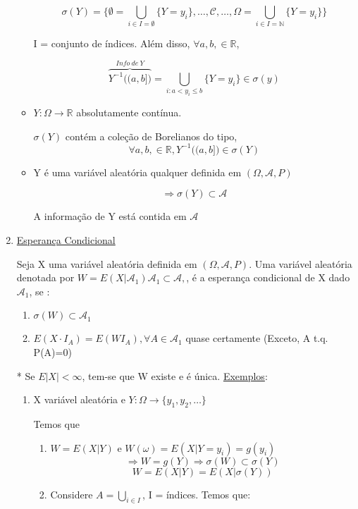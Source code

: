 \documentclass[a4paper,12pt]{article}
\begin{document}
\begin{enumerate}[label=\roman*)]
\begin{itemize}
	$$\sigma(Y) = \bigg\{
		\emptyset = \bigcup\limits_{i \in I=\emptyset}\{Y=y_i\}, \ldots, \mathscr C, \ldots, \Omega= \bigcup\limits_{i \in I=\mathbb N}\{Y=y_i\} \bigg\}
$$

I = conjunto de índices. Além disso, $\forall a,b,\in \mathbb R$,

$$\overbrace{Y^{-1} \bigg(
(a,b]
\bigg)}^{Info\ de \ Y} = \bigcup\limits_{i:a<y_i\le b} \{Y=y_i\} \in \sigma(y) $$

\item 
$Y:\Omega \longrightarrow \mathbb R$ absolutamente contínua.

$\sigma(Y)$ contém a coleção de Borelianos do tipo,
$$\forall a,b,\in \mathbb R, Y^{-1}\bigg((a,b]\bigg)\in \sigma(Y) $$
\item  Y é uma variável aleatória qualquer definida em $(\Omega,\mathscr{A},P)$

$$\Rightarrow \sigma(Y) \subset \mathscr A $$

A informação de Y está contida em $\mathscr A$


\end{itemize}

\item \underline{Esperança Condicional }

Seja X uma variável aleatória definida em $(\Omega,\mathscr{A},P)$. Uma variável aleatória denotada por $ W = E(X| \mathscr A_1 )\mathscr A_1\subset \mathscr A,$, é a esperança condicional de X dado $\mathscr A_1$, se :
\begin{enumerate}
	\item $\sigma(W)\subset \mathscr A_1$
	\item $E(X\cdot I_A) = E(W I_A), \forall A \in \mathscr A_1$ quase certamente (Exceto, A t.q. P(A)=0)
\end{enumerate}
* Se $E|X| < \infty$, tem-se que W existe e é única.
\underline{Exemplos}:

\begin{enumerate}[label = \arabic*)]
	\item  X variável aleatória e $Y:\Omega \longrightarrow \{y_1,y_2,\ldots\}$
	
	Temos que
	\begin{enumerate}[label=\roman*)]
		\item  $W=E(X|Y)$ e $W(\omega) = E(X|Y=y_i)=g(y_i)$
		$$\Rightarrow W=g(Y) \Rightarrow \sigma(W)\subset \sigma(Y) $$
		$$W=E(X|Y)=E(X|\sigma(Y)) $$
		
		\item Considere $A=\bigcup\limits_{i\in I}$, I = índices. Temos que:
		

\end{enumerate}
\end{enumerate}
\end{enumerate}
\end{document}
